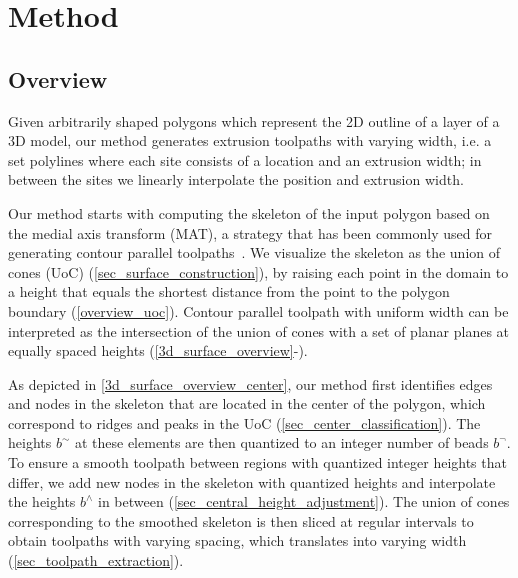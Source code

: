 \section{Method}
\subsection{Overview}

Given arbitrarily shaped polygons which represent the 2D outline of a layer of a 3D model, our method generates extrusion toolpaths with varying width, i.e. a set polylines where each site consists of a location and an extrusion width;
in between the sites we linearly interpolate the position and extrusion width.

Our method starts with computing the skeleton of the input polygon based on the medial axis transform (MAT), a strategy that has been commonly used for generating contour parallel toolpaths~\cite{eiamsa2003toward}. 
We visualize the skeleton as the union of cones (UoC) (\cref{sec_surface_construction}), by raising each point in the domain to a height that equals the shortest distance from the point to the polygon boundary (\cref{overview_uoc}).
Contour parallel toolpath with uniform width can be interpreted as the intersection of the union of cones with a set of planar planes at equally spaced heights (\cref{3d_surface_overview}-).

As depicted in \cref{3d_surface_overview_center}, our method first identifies edges and nodes in the skeleton that are located in the center of the polygon, which correspond to ridges and peaks in the UoC  (\cref{sec_center_classification}).
The heights $b^\sim$ at these elements are then quantized to an integer number of beads $b^\neg$.
To ensure a smooth toolpath between regions with quantized integer heights that differ, we add new nodes in the skeleton with quantized heights and interpolate the heights $b^\wedge$ in between (\cref{sec_central_height_adjustment}).
The union of cones corresponding to the smoothed skeleton is then sliced at regular intervals to obtain toolpaths with varying spacing, which translates into varying width (\cref{sec_toolpath_extraction}).


